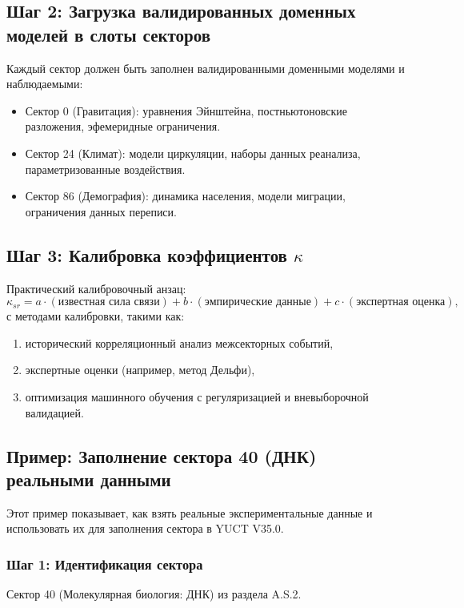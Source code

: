 \documentclass[11pt,a4paper]{article}
\begin{document}
	\subsection*{Шаг 2: Загрузка валидированных доменных моделей в слоты секторов}
	Каждый сектор должен быть заполнен валидированными доменными моделями и наблюдаемыми:
	\begin{itemize}[leftmargin=*]
		\item Сектор 0 (Гравитация): уравнения Эйнштейна, постньютоновские разложения, эфемеридные ограничения.
		\item Сектор 24 (Климат): модели циркуляции, наборы данных реанализа, параметризованные воздействия.
		\item Сектор 86 (Демография): динамика населения, модели миграции, ограничения данных переписи.
	\end{itemize}
	
	\subsection*{Шаг 3: Калибровка коэффициентов $\kappa$}
	Практический калибровочный анзац:
	\[
	\kappa_{sr} = a\cdot (\text{известная сила связи}) + b\cdot (\text{эмпирические данные}) + c\cdot (\text{экспертная оценка}),
	\]
	с методами калибровки, такими как:
	\begin{enumerate}[leftmargin=*]
		\item исторический корреляционный анализ межсекторных событий,
		\item экспертные оценки (например, метод Дельфи),
		\item оптимизация машинного обучения с регуляризацией и вневыборочной валидацией.
	\end{enumerate}
	
	\subsection*{Пример: Заполнение сектора 40 (ДНК) реальными данными}
	
	Этот пример показывает, как взять реальные экспериментальные данные и использовать их для заполнения сектора в YUCT V35.0.
	
	\subsubsection*{Шаг 1: Идентификация сектора}
	Сектор 40 (Молекулярная биология: ДНК) из раздела A.S.2.
	
\end{document}
